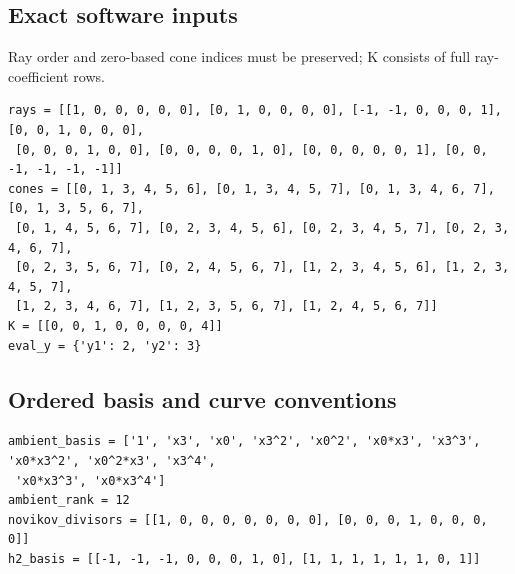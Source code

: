 \documentclass[10pt,a4paper]{article}
\begin{document}
\subsection*{Exact software inputs}
Ray order and zero-based cone indices must be preserved; K consists of full ray-coefficient rows.
\begin{lstlisting}
rays = [[1, 0, 0, 0, 0, 0], [0, 1, 0, 0, 0, 0], [-1, -1, 0, 0, 0, 1], [0, 0, 1, 0, 0, 0],
 [0, 0, 0, 1, 0, 0], [0, 0, 0, 0, 1, 0], [0, 0, 0, 0, 0, 1], [0, 0, -1, -1, -1, -1]]
cones = [[0, 1, 3, 4, 5, 6], [0, 1, 3, 4, 5, 7], [0, 1, 3, 4, 6, 7], [0, 1, 3, 5, 6, 7],
 [0, 1, 4, 5, 6, 7], [0, 2, 3, 4, 5, 6], [0, 2, 3, 4, 5, 7], [0, 2, 3, 4, 6, 7],
 [0, 2, 3, 5, 6, 7], [0, 2, 4, 5, 6, 7], [1, 2, 3, 4, 5, 6], [1, 2, 3, 4, 5, 7],
 [1, 2, 3, 4, 6, 7], [1, 2, 3, 5, 6, 7], [1, 2, 4, 5, 6, 7]]
K = [[0, 0, 1, 0, 0, 0, 0, 4]]
eval_y = {'y1': 2, 'y2': 3}
\end{lstlisting}
\subsection*{Ordered basis and curve conventions}
\begin{lstlisting}
ambient_basis = ['1', 'x3', 'x0', 'x3^2', 'x0^2', 'x0*x3', 'x3^3', 'x0*x3^2', 'x0^2*x3', 'x3^4',
 'x0*x3^3', 'x0*x3^4']
ambient_rank = 12
novikov_divisors = [[1, 0, 0, 0, 0, 0, 0, 0], [0, 0, 0, 1, 0, 0, 0, 0]]
h2_basis = [[-1, -1, -1, 0, 0, 0, 1, 0], [1, 1, 1, 1, 1, 1, 0, 1]]
\end{lstlisting}
\end{document}
